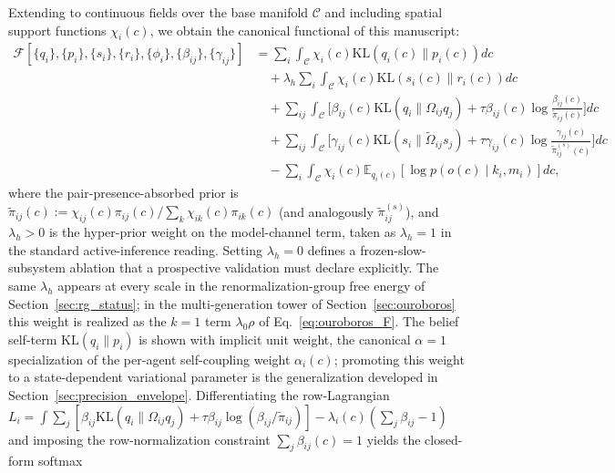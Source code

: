\documentclass[11pt]{article}
\begin{document}
Extending to continuous fields over the base manifold $\mathcal{C}$ and including spatial support functions $\chi_i(c)$, we obtain the canonical functional of this manuscript:
\begin{equation}
\boxed{
\begin{aligned}
\mathcal{F}[\{q_i\}, \{p_i\}, \{s_i\}, \{r_i\}, \{\phi_i\}, \{\beta_{ij}\}, \{\gamma_{ij}\}]
&= \sum_i \int_{\mathcal{C}} \chi_i(c)  \mathrm{KL}(q_i(c) \| p_i(c))  dc \\
&\quad + \lambda_h \sum_i \int_{\mathcal{C}} \chi_i(c)  \mathrm{KL}(s_i(c) \| r_i(c))  dc \\
&\quad + \sum_{ij} \int_{\mathcal{C}} \Big[\beta_{ij}(c)  \mathrm{KL}(q_i \| \Omega_{ij} q_j) + \tau \beta_{ij}(c) \log\tfrac{\beta_{ij}(c)}{\tilde{\pi}_{ij}(c)}\Big] dc \\
&\quad + \sum_{ij} \int_{\mathcal{C}} \Big[\gamma_{ij}(c)  \mathrm{KL}(s_i \| \tilde{\Omega}_{ij} s_j) + \tau \gamma_{ij}(c) \log\tfrac{\gamma_{ij}(c)}{\tilde{\pi}^{(s)}_{ij}(c)}\Big] dc \\
&\quad - \sum_i \int_{\mathcal{C}} \chi_i(c)  \mathbb{E}_{q_i(c)}[\log p(o(c) \mid k_i, m_i)]  dc,
\end{aligned}
}
\label{eq:free_energy_functional_final}
\end{equation}
where the pair-presence-absorbed prior is $\tilde{\pi}_{ij}(c) := \chi_{ij}(c)\pi_{ij}(c) / \sum_k \chi_{ik}(c)\pi_{ik}(c)$ (and analogously $\tilde{\pi}^{(s)}_{ij}$), and $\lambda_h > 0$ is the hyper-prior weight on the model-channel term, taken as $\lambda_h = 1$ in the standard active-inference reading. Setting $\lambda_h = 0$ defines a frozen-slow-subsystem ablation that a prospective validation must declare explicitly. The same $\lambda_h$ appears at every scale in the renormalization-group free energy of Section~\ref{sec:rg_status}; in the multi-generation tower of Section~\ref{sec:ouroboros} this weight is realized as the $k = 1$ term $\lambda_0\rho$ of Eq.~\eqref{eq:ouroboros_F}. The belief self-term $\mathrm{KL}(q_i \| p_i)$ is shown with implicit unit weight, the canonical $\alpha = 1$ specialization of the per-agent self-coupling weight $\alpha_i(c)$; promoting this weight to a state-dependent variational parameter is the generalization developed in Section~\ref{sec:precision_envelope}. Differentiating the row-Lagrangian $L_i = \int \sum_j[\beta_{ij}\mathrm{KL}(q_i \| \Omega_{ij} q_j) + \tau\beta_{ij}\log(\beta_{ij}/\tilde{\pi}_{ij})] - \lambda_i(c)(\sum_j \beta_{ij} - 1)$ and imposing the row-normalization constraint $\sum_j \beta_{ij}(c) = 1$ yields the closed-form softmax
\end{document}

